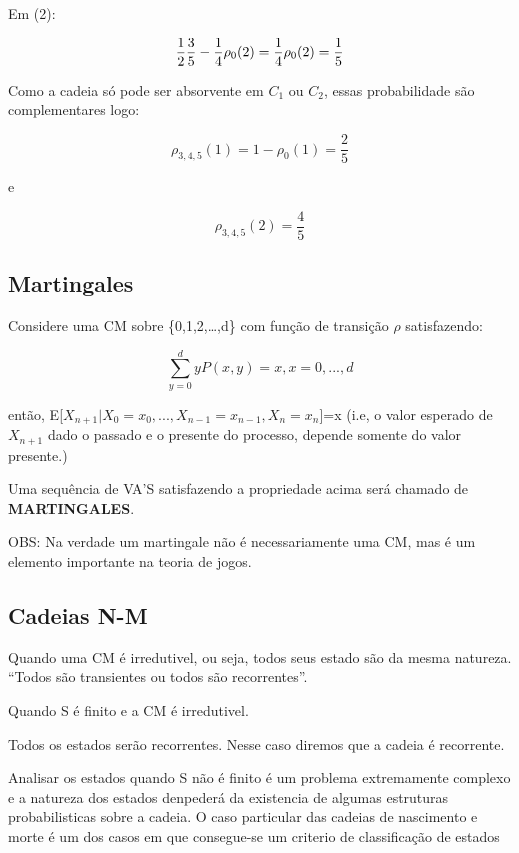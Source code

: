 \documentclass[]{article}
\theoremstyle{definition}
\theoremstyle{definition}
\theoremstyle{definition}
\theoremstyle{remark}
\let\BeginKnitrBlock\begin \let\EndKnitrBlock\end
\begin{document}
Em (2):

\begin{equation}
\frac{1}{2} \frac{3}{5} - \frac{1}{4} \rho_{{0}}(2)= \frac{1}{4}\\
\rho_{{0}}(2) = \frac{1}{5}
\end{equation}

Como a cadeia só pode ser absorvente em \(C_1\) ou \(C_2\), essas
probabilidade são complementares logo:

\[\rho_{{3,4,5}}(1) = 1 - \rho_{{0}}(1) = \frac{2}{5}\]

e

\[\rho_{{3,4,5}}(2) = \frac{4}{5}\]

\subsection{Martingales}\label{martingales}

Considere uma CM sobre \{0,1,2,\ldots{},d\} com função de transição
\(\rho\) satisfazendo:

\[\sum_{y=0}^d yP(x,y) = x, x=0,...,d\]

então, E{[}\(X_{n+1}|X_0 = x_0,...,X_{n-1}=x_{n-1},X_n=x_n\){]}=x (i.e,
o valor esperado de \(X_{n+1}\) dado o passado e o presente do processo,
depende somente do valor presente.)

\BeginKnitrBlock{definition}
\protect\hypertarget{def:unnamed-chunk-46}{}{\label{def:unnamed-chunk-46}
}Uma sequência de VA'S satisfazendo a propriedade acima será chamado de
\textbf{MARTINGALES}.
\EndKnitrBlock{definition}

OBS: Na verdade um martingale não é necessariamente uma CM, mas é um
elemento importante na teoria de jogos.

\subsection{Cadeias N-M}\label{cadeias-n-m}

Quando uma CM é irredutivel, ou seja, todos seus estado são da mesma
natureza. ``Todos são transientes ou todos são recorrentes''.

Quando S é finito e a CM é irredutivel.

Todos os estados serão recorrentes. Nesse caso diremos que a cadeia é
recorrente.

Analisar os estados quando S não é finito é um problema extremamente
complexo e a natureza dos estados denpederá da existencia de algumas
estruturas probabilisticas sobre a cadeia. O caso particular das cadeias
de nascimento e morte é um dos casos em que consegue-se um criterio de
classificação de estados
\end{document}
